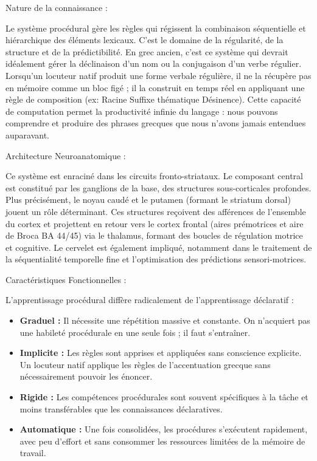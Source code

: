 Nature de la connaissance :

Le système procédural gère les règles qui régissent la combinaison séquentielle et hiérarchique des
éléments lexicaux. C'est le domaine de la régularité, de la structure et de la prédictibilité. En
grec ancien, c'est ce système qui devrait idéalement gérer la déclinaison d'un nom ou la conjugaison
d'un verbe régulier. Lorsqu'un locuteur natif produit une forme verbale régulière, il ne la \og
récupère\fg{} pas en mémoire comme un bloc figé ; il la construit en temps réel en appliquant une
règle de composition (ex: Racine \+ Suffixe thématique \+ Désinence). Cette capacité de computation
permet la productivité infinie du langage : nous pouvons comprendre et produire des phrases grecques
que nous n'avons jamais entendues auparavant.

Architecture Neuroanatomique :

Ce système est enraciné dans les circuits fronto-striataux. Le composant central est constitué par
les ganglions de la base, des structures sous-corticales profondes. Plus précisément, le noyau caudé
et le putamen (formant le striatum dorsal) jouent un rôle déterminant. Ces structures reçoivent des
afférences de l'ensemble du cortex et projettent en retour vers le cortex frontal (aires prémotrices
et aire de Broca \- BA 44/45) via le thalamus, formant des boucles de régulation motrice et
cognitive. Le cervelet est également impliqué, notamment dans le traitement de la séquentialité
temporelle fine et l'optimisation des prédictions sensori-motrices.

Caractéristiques Fonctionnelles :

L'apprentissage procédural diffère radicalement de l'apprentissage déclaratif :

\begin{itemize}\item \textbf{Graduel :} Il nécessite une répétition massive et constante. On n'acquiert pas une habileté procédurale en une seule fois ; il faut s'entraîner.\item \textbf{Implicite :} Les règles sont apprises et appliquées sans conscience explicite. Un locuteur natif applique les règles de l'accentuation grecque sans nécessairement pouvoir les énoncer.\item \textbf{Rigide :} Les compétences procédurales sont souvent spécifiques à la tâche et moins transférables que les connaissances déclaratives.\item \textbf{Automatique :} Une fois consolidées, les procédures s'exécutent rapidement, avec peu d'effort et sans consommer les ressources limitées de la mémoire de travail.\end{itemize}

